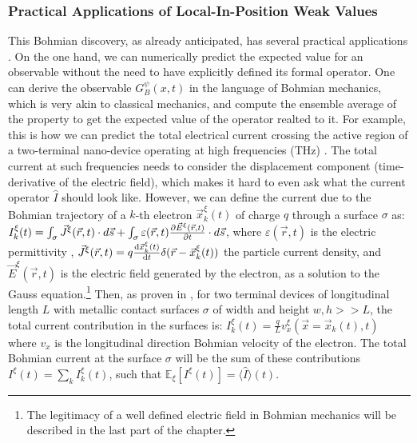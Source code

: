 \documentclass[11pt, a4paper]{article} %
\begin{document}
\subsubsection*{Practical Applications of Local-In-Position Weak Values}


This Bohmian discovery, as already anticipated, has several practical applications \cite{DevInPosition1, DevInPosition2}. On the one hand, we can numerically predict the expected value for an observable without the need to have explicitly defined its formal operator. One can derive the observable $G^\psi_B(x,t)$ in the language of Bohmian mechanics, which is very akin to classical mechanics, and compute the ensemble average of the property to get the expected value of the operator realted to it. For example, this is how we can predict the total electrical current crossing the active region of a two-terminal nano-device operating at high frequencies (THz) \cite{equiv, Pel}. The total current at such frequencies needs to consider the displacement component (time-derivative of the electric field), which makes it hard to even ask what the current operator $\hat{I}$ should look like. However, we can define the current due to the Bohmian trajectory of a $k$-th electron $\vec{x}_k^\xi(t)$ of charge $q$ through a surface $\sigma$ as: $I_k^\xi(t)=\int_\sigma \vec{J}^\xi(\vec{r},t)\cdot d\vec{s}+\int_\sigma \varepsilon(\vec{r},t)\pdv{\vec{E}^\xi(\vec{r},t)}{t}\cdot d\vec{s}$, where $\varepsilon(\vec{r},t)$ is the electric permittivity , $\vec{J}^\xi(\vec{r},t)=q\dv{\vec{x}_k^\xi(t)}{t}\delta(\vec{r}-\vec{x}_k^\xi(t))$ the particle current density, and $\vec{E}^\xi(\vec{r},t)$ is the electric field generated by the electron, as a solution to the Gauss equation.\footnote{The legitimacy of a well defined electric field in Bohmian mechanics will be described in the last part of the chapter.} Then, as proven in \cite{Pel}, for two terminal devices of longitudinal length $L$ with metallic contact surfaces $\sigma$ of width and height $w,h>>L$, the total current contribution in the surfaces is: $I^\xi_k(t)=\frac{q}{L}v_x^\xi(\vec{x}=\vec{x}_k(t), t) $ where $v_x$ is the longitudinal direction Bohmian velocity of the electron. The total Bohmian current at the surface $\sigma$ will be the sum of these contributions $I^\xi(t)=\sum_k I^\xi_k(t)$, such that $\mathbb{E}_\xi [I^\xi(t)]=\langle \hat{I}\rangle(t)$. 
\end{document}
